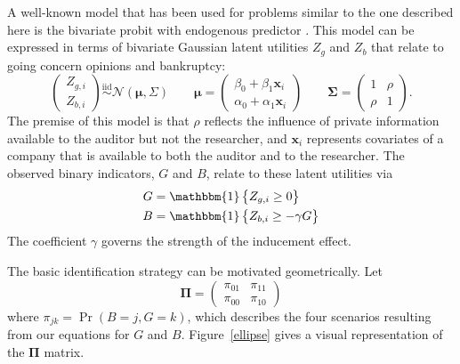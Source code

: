 \documentclass[aoas,preprint, 11pt, dvipsnames, table, x11name]{imsart}
\renewcommand{\bm}[1]{\mathbf{#1}}
\theoremstyle{remark}
\begin{document}
	A well-known model that has been used for problems similar to the one described here is the bivariate probit with endogenous predictor \citep[Section~ 15.7.3]{Wooldridge-2010}. This model can be expressed in terms of bivariate Gaussian latent utilities $Z_g$ and $Z_b$ that relate to going concern opinions and bankruptcy: 
	\begin{equation}
		\begin{pmatrix}
			Z_{g,i}\\
			Z_{b,i}
		\end{pmatrix}\stackrel{\text{iid}}{\sim}\mathcal{N}(\bm{\mu}, \Sigma)
		\qquad \bm{\mu}=\begin{pmatrix}
			\beta_0+\beta_1\bm{x}_i\\
			\alpha_0+\alpha_1\bm{x}_i
		\end{pmatrix}
		\qquad
		\bm{\Sigma}=\begin{pmatrix}
			1&\rho\\
			\rho&1
		\end{pmatrix}.
		\label{latentutility}
	\end{equation}
	The premise of this model is that $\rho$ reflects the influence of private information available to the auditor but not the researcher, and $\bm{x}_i$ represents covariates of a company that is available to both the auditor and to the researcher. The observed binary indicators, $G$ and $B$, relate to these latent utilities via
	\begin{align}
		G&=\mathbbm{1}\cbr{Z_{g,i}\geq 0}\\
		B&=\mathbbm{1}\cbr{Z_{b,i}\geq -\gamma G}
		\label{align1}
	\end{align}
	The coefficient $\gamma$ governs the strength of the inducement effect.
	
	The basic identification strategy can be motivated geometrically. Let $$\bm{\Pi}=\begin{pmatrix}
		\pi_{01}&\pi_{11}\\
		\pi_{00}&\pi_{10}
	\end{pmatrix}$$
	where $\pi_{jk}=\Pr(B=j, G=k)$, which describes the four scenarios resulting from our equations for $G$ and $B$.  Figure~\ref{ellipse} gives a visual representation of the $\bm{\Pi}$ matrix.
	
\end{document}
